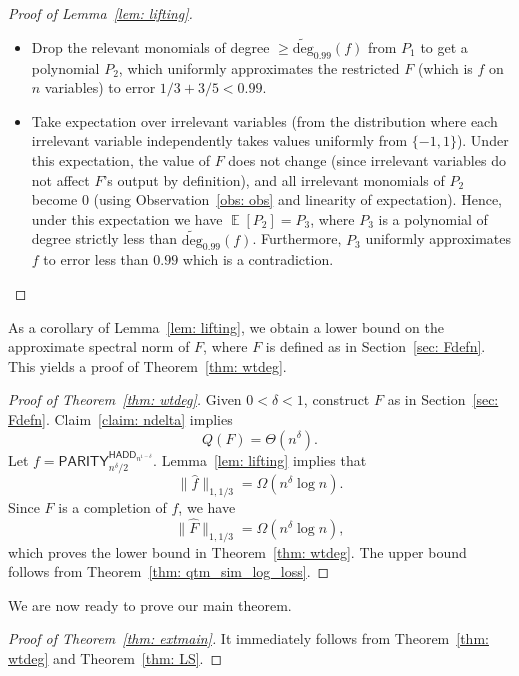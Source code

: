 \documentclass[10pt,a4paper]{article}
\theoremstyle{definition}
\newcommand{\bra}[1]{\{#1\}}
\newcommand{\pmone}{\bra{-1,1}}
\newcommand{\adeg}{\widetilde{\mathrm{deg}}}
\newcommand{\asnorm}[2]{\|\widehat{#1}\|_{1,#2}}
\newcommand{\HADD}{\mathsf{HADD}}
\newcommand{\PARITY}{\mathsf{PARITY}}
\DeclareMathOperator*{\Exp}{\mathbb E}
\begin{document}
\begin{proof}[Proof of Lemma~\ref{lem: lifting}]
\begin{itemize}
    \item Drop the relevant monomials of degree $\geq \adeg_{0.99}(f)$ from $P_1$ to get a polynomial $P_2$, which uniformly approximates the restricted $F$ (which is $f$ on $n$ variables) to error $1/3 + 3/5 < 0.99$.
    \item Take expectation over irrelevant variables (from the distribution where each irrelevant variable independently takes values uniformly from $\pmone$).  Under this expectation, the value of $F$ does not change (since irrelevant variables do not affect $F$'s output by definition), and all irrelevant monomials of $P_2$ become 0 (using Observation~\ref{obs: obs} and linearity of expectation).  Hence, under this expectation we have $\Exp[P_2] = P_3$, where $P_3$ is a polynomial of degree strictly less than $\adeg_{0.99}(f)$.  Furthermore, $P_3$ uniformly approximates $f$ to error less than $0.99$ which is a contradiction. 
\end{itemize}
\end{proof}


As a corollary of Lemma~\ref{lem: lifting}, we obtain a lower bound on the approximate spectral norm of $F$, where $F$ is defined as in Section~\ref{sec: Fdefn}.  This yields a proof of Theorem~\ref{thm: wtdeg}.

\begin{proof}[Proof of Theorem~\ref{thm: wtdeg}]
Given $0 < \delta < 1$, construct $F$ as in Section~\ref{sec: Fdefn}.  Claim~\ref{claim: ndelta} implies 
\[
Q(F) = \Theta(n^{\delta}).
\]
Let $f = \PARITY_{n^{\delta}/2}^{\HADD_{n^{1 - \delta}}}$.  Lemma~\ref{lem: lifting} implies that 
\[
\asnorm{f}{1/3} = \Omega(n^{\delta} \log n).
\]
Since $F$ is a completion of $f$, we have 
\[
\asnorm{F}{1/3} = \Omega(n^{\delta} \log n),
\]
which proves the lower bound in Theorem~\ref{thm: wtdeg}.  The upper bound follows from Theorem~\ref{thm: qtm_sim_log_loss}.
\end{proof}

We are now ready to prove our main theorem.
\begin{proof}[Proof of Theorem~\ref{thm: extmain}]
It immediately follows from Theorem~\ref{thm: wtdeg} and Theorem~\ref{thm: LS}.
\end{proof}
\end{document}
